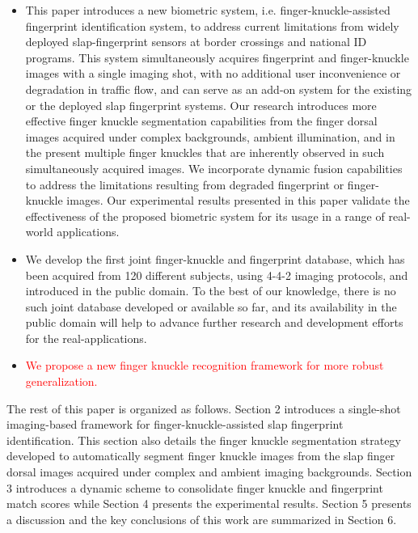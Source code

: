\begin{itemize}
    \item This paper introduces a new biometric system, i.e. finger-knuckle-assisted fingerprint identification system, to address current limitations from widely deployed slap-fingerprint sensors at border crossings and national ID programs. This system simultaneously acquires fingerprint and finger-knuckle images with a single imaging shot, with no additional user inconvenience or degradation in traffic flow, and can serve as an add-on system for the existing or the deployed slap fingerprint systems. Our research introduces more effective finger knuckle segmentation capabilities from the finger dorsal images acquired under complex backgrounds, ambient illumination, and in the present multiple finger knuckles that are inherently observed in such simultaneously acquired images. We incorporate dynamic fusion capabilities to address the limitations resulting from degraded fingerprint or finger-knuckle images. Our experimental results presented in this paper validate the effectiveness of the proposed biometric system for its usage in a range of real-world applications. 
    \item We develop the first joint finger-knuckle and fingerprint database, which has been acquired from 120 different subjects, using 4-4-2 imaging protocols, and introduced in the public domain. To the best of our knowledge, there is no such joint database developed or available so far, and its availability in the public domain will help to advance further research and development efforts for the real-applications. 
    \item \textcolor{red}{We propose a new finger knuckle recognition framework for more robust generalization.} 
\end{itemize}


The rest of this paper is organized as follows. Section 2 introduces a single-shot imaging-based framework for finger-knuckle-assisted slap fingerprint identification. This section also details the finger knuckle segmentation strategy developed to automatically segment finger knuckle images from the slap finger dorsal images acquired under complex and ambient imaging backgrounds. Section 3 introduces a dynamic scheme to consolidate finger knuckle and fingerprint match scores while Section 4 presents the experimental results. Section 5 presents a discussion and the key conclusions of this work are summarized in Section 6.


